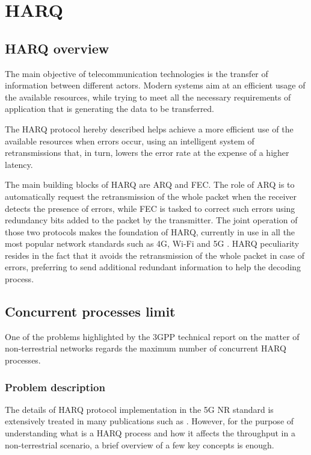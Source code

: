 
\chapter{HARQ}
\label{chp:harq}

\section{HARQ overview}
The main objective of telecommunication technologies is the transfer of information between different actors. Modern systems aim at an efficient usage of the available resources, while trying to meet all the necessary requirements of application that is generating the data to be transferred. 

The \ac{HARQ} protocol hereby described helps achieve a more efficient use of the available resources when errors occur, using an intelligent system of retransmissions that, in turn, lowers the error rate at the expense of a higher latency.

The main building blocks of \ac{HARQ} are \ac{ARQ} and \ac{FEC}. The role of \ac{ARQ} is to automatically request the retransmission of the whole packet when the receiver detects the presence of errors, while \ac{FEC} is tasked to correct such errors using redundancy bits added to the packet by the transmitter. The joint operation of those two protocols makes the foundation of \ac{HARQ}, currently in use in all the most popular network standards such as 4G, Wi-Fi and 5G \cite{3gpp-38-series}. \ac{HARQ} peculiarity resides in the fact that it avoids the retransmission of the whole packet in case of errors, preferring to send additional redundant information to help the decoding process.

\section{Concurrent processes limit}

One of the problems highlighted by the \ac{3GPP} technical report \cite{3gpp-tr-38.811} on the matter of non-terrestrial networks regards the maximum number of concurrent \ac{HARQ} processes. 

\subsection{Problem description}
The details of \ac{HARQ} protocol implementation in the 5G \ac{NR} standard is extensively treated in many publications such as \cite{harq-wireless-communications-survey}. However, for the purpose of understanding what is a \ac{HARQ} process and how it affects the throughput in a non-terrestrial scenario, a brief overview of a few key concepts is enough.

